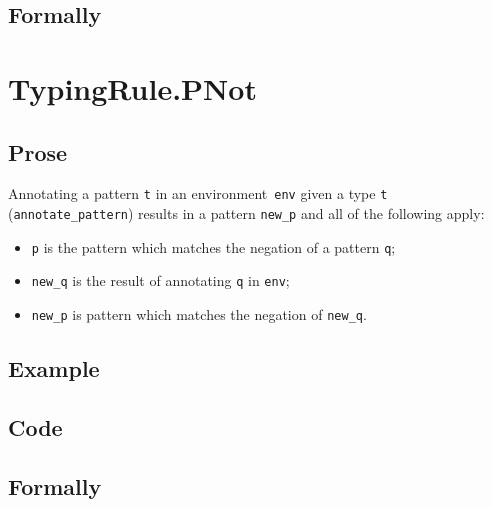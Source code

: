\documentclass{book}
\begin{document}
\begin{emptyformal}
    \subsection{Formally}
\end{emptyformal}


\section{TypingRule.PNot \label{sec:TypingRule.PNot}}

  \subsection{Prose}
   Annotating a pattern \texttt{t} in an environment~\texttt{env} given a type \texttt{t} (\texttt{annotate\_pattern}) results in a pattern \texttt{new\_p} and all of the following apply:
   \begin{itemize}
   \item \texttt{p} is the pattern which matches the negation of a pattern \texttt{q};
   \item \texttt{new\_q} is the result of annotating \texttt{q} in \texttt{env};
   \item \texttt{new\_p} is pattern which matches the negation of \texttt{new\_q}.
   \end{itemize}

  \subsection{Example}

  \subsection{Code}

\begin{emptyformal}
    \subsection{Formally}
\end{emptyformal}

\end{document}
